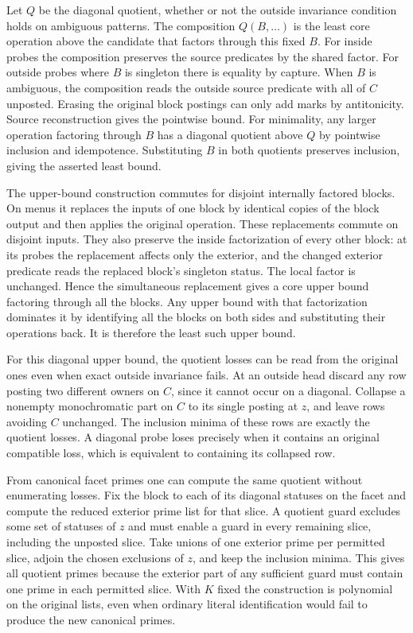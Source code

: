 Let $Q$ be the diagonal quotient, whether or not
the outside invariance condition holds on ambiguous
patterns. The composition $Q(B,\ldots)$ is the
least core operation above the candidate that
factors through this fixed $B$. For inside probes
the composition preserves the source predicates
by the shared factor. For outside probes where
$B$ is singleton there is equality by capture.
When $B$ is ambiguous, the composition reads the
outside source predicate with all of $C$ unposted.
Erasing the original block postings can only add
marks by antitonicity. Source reconstruction gives
the pointwise bound. For minimality, any larger
operation factoring through $B$ has a diagonal
quotient above $Q$ by pointwise inclusion and
idempotence. Substituting $B$ in both quotients
preserves inclusion, giving the asserted least
bound.

The upper-bound construction commutes for disjoint
internally factored blocks. On menus it replaces the
inputs of one block by identical copies of the block
output and then applies the original operation.
These replacements commute on disjoint inputs.
They also preserve the inside factorization of every
other block: at its probes the replacement affects
only the exterior, and the changed exterior
predicate reads the replaced block's singleton
status. The local factor is unchanged. Hence the
simultaneous replacement gives a core upper bound
factoring through all the blocks. Any upper bound
with that factorization dominates it by identifying
all the blocks on both sides and substituting their
operations back. It is therefore the least such
upper bound.

For this diagonal upper bound, the quotient losses
can be read from the original ones even when exact
outside invariance fails. At an outside head discard
any row posting two different owners on $C$, since
it cannot occur on a diagonal. Collapse a nonempty
monochromatic part on $C$ to its single posting at
$z$, and leave rows avoiding $C$ unchanged. The
inclusion minima of these rows are exactly the
quotient losses. A diagonal probe loses precisely
when it contains an original compatible loss, which
is equivalent to containing its collapsed row.

From canonical facet primes one can compute the same
quotient without enumerating losses. Fix the block
to each of its diagonal statuses on the facet and
compute the reduced exterior prime list for that
slice. A quotient guard excludes some set of statuses
of $z$ and must enable a guard in every remaining
slice, including the unposted slice. Take unions of
one exterior prime per permitted slice, adjoin the
chosen exclusions of $z$, and keep the inclusion
minima. This gives all quotient primes because the
exterior part of any sufficient guard must contain
one prime in each permitted slice. With $K$ fixed
the construction is polynomial on the original
lists, even when ordinary literal identification
would fail to produce the new canonical primes.

